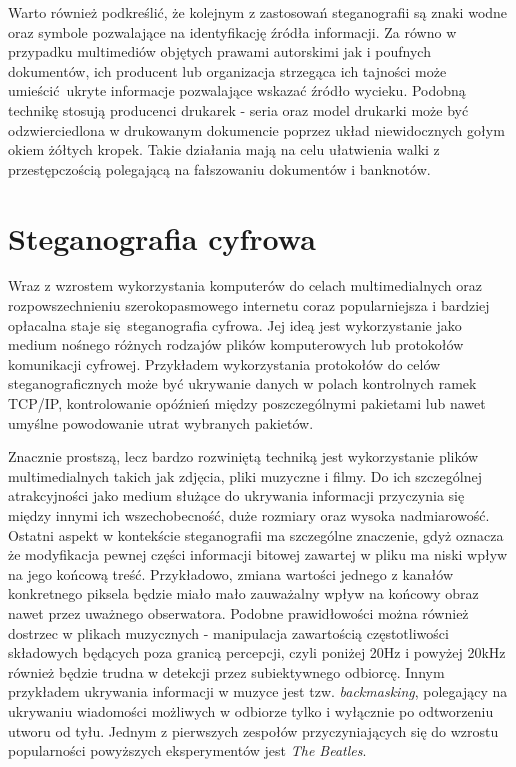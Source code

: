 {{        %
        Warto również podkreślić, że kolejnym z zastosowań steganografii są znaki wodne oraz symbole pozwalające na
        identyfikację źródła informacji. Za równo w przypadku multimediów objętych prawami autorskimi jak i poufnych
        dokumentów, ich producent lub organizacja strzegąca ich tajności może umieścić ukryte informacje pozwalające
        wskazać źródło wycieku\cite{Nasereddin2011DIGITALWA}. Podobną technikę stosują producenci drukarek - seria oraz
        model drukarki może być odzwierciedlona w drukowanym dokumencie poprzez układ niewidocznych gołym okiem żółtych
        kropek. Takie działania mają na celu ułatwienia walki z przestępczością polegającą na fałszowaniu dokumentów i
        banknotów\cite{Richter2018ForensicAA}.
    }

    \section{Steganografia cyfrowa}
    {
        Wraz z wzrostem wykorzystania komputerów do celach multimedialnych oraz rozpowszechnieniu szerokopasmowego
        internetu coraz popularniejsza i bardziej opłacalna staje się steganografia cyfrowa. Jej ideą jest wykorzystanie
        jako medium nośnego różnych rodzajów plików komputerowych lub protokołów komunikacji cyfrowej. Przykładem
        wykorzystania protokołów do celów steganograficznych może być ukrywanie danych w polach kontrolnych ramek
        TCP/IP, kontrolowanie opóźnień między poszczególnymi pakietami lub nawet umyślne powodowanie utrat wybranych
        pakietów\cite{DataHidinginTCP}.

        Znacznie prostszą, lecz bardzo rozwiniętą techniką jest wykorzystanie plików multimedialnych takich jak zdjęcia,
        pliki muzyczne i filmy. Do ich szczególnej atrakcyjności jako medium służące do ukrywania informacji przyczynia
        się między innymi ich wszechobecność, duże rozmiary oraz wysoka nadmiarowość\cite{Mitchell2018H264ED,
        Pope2012DigitalS}. Ostatni aspekt w kontekście steganografii ma szczególne znaczenie, gdyż oznacza że
        modyfikacja pewnej części informacji bitowej zawartej w pliku ma niski wpływ na jego końcową treść. Przykładowo,
        zmiana wartości jednego z kanałów konkretnego piksela będzie miało mało zauważalny wpływ na końcowy obraz nawet
        przez uważnego obserwatora. Podobne prawidłowości można również dostrzec w plikach muzycznych - manipulacja
        zawartością częstotliwości składowych będących poza granicą percepcji, czyli poniżej 20Hz i powyżej 20kHz
        również będzie trudna w detekcji przez subiektywnego odbiorcę\cite{Wheeler2012AudioSU}. Innym przykładem
        ukrywania informacji w muzyce jest tzw. \textit{backmasking}, polegający na ukrywaniu wiadomości możliwych w
        odbiorze tylko i wyłącznie po odtworzeniu utworu od tyłu. Jednym z pierwszych zespołów przyczyniających się do
        wzrostu popularności powyższych eksperymentów jest \textit{The Beatles}.
    }

}
